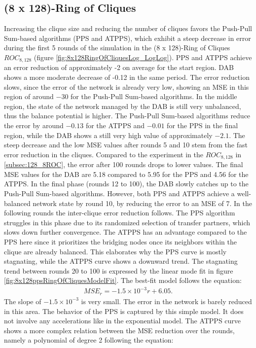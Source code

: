 \subsection{(8 x 128)-Ring of Cliques}\label{subsec:8_128ROC}
Increasing the clique size and reducing the number of cliques favors the Push-Pull Sum-based algorithms (PPS and ATPPS), which exhibit a steep decrease in error during the first 5 rounds of the simulation in the (8 x 128)-Ring of Cliques $ROC_{8,128}$ (figure \ref{fig:8x128RingOfCliquesLog_LogLog}). PPS and ATPPS achieve an error reduction of approximately -2 on average for the start region. DAB shows a more moderate decrease of -0.12 in the same period. The error reduction slows, since the error of the network is already very low, showing an MSE in this region of around $-30$ for the Push-Pull Sum-based algorithms. In the middle region, the state of the network managed by the DAB is still very unbalanced, thus the balance potential is higher. The Push-Pull Sum-based algorithms reduce the error by around $-0.13$ for the ATPPS and $-0.01$ for the PPS in the final region, while the DAB shows a still very high value of approximately $-2.1$. The steep decrease and the low MSE values after rounds 5 and 10 stem from the fast error reduction in the cliques. Compared to the experiment in the $ROC_{8, 128}$ in \ref{subsec:128_8ROC}, the error after 100 rounds drops to lower values. The final MSE values for the DAB are 5.18 compared to 5.95 for the PPS and 4.56 for the ATPPS. In the final phase (rounds 12 to 100), the DAB slowly catches up to the Push-Pull Sum-based algorithms. However, both PPS and ATPPS achieve a well-balanced network state by round 10, by reducing the error to an MSE of 7. In the following rounds the inter-clique error reduction follows. The PPS algorithm struggles in this phase due to its randomized selection of transfer partners, which slows down further convergence. The ATPPS has an advantage compared to the PPS here since it prioritizes the bridging nodes once its neighbors within the clique are already balanced. This elaborates why the PPS curve is mostly stagnating, while the ATPPS curve shows a downward trend. The stagnating trend between rounds 20 to 100 is expressed by the linear mode fit in figure \ref{fig:8x128ppsRingOfCliquesModelFit}. The best-fit model follows the equation:
\begin{align}
    MSE_r=-1.5\times10^{-3}r+6.05. 
\end{align}
The slope of $-1.5\times10^{-3}$ is very small. The error in the network is barely reduced in this area. The behavior of the PPS is captured by this simple model. It does not involve any accelerations like in the exponential model. The ATPPS curve shows a more complex relation between the MSE reduction over the rounds, namely a polynomial of degree 2 following the equation:
